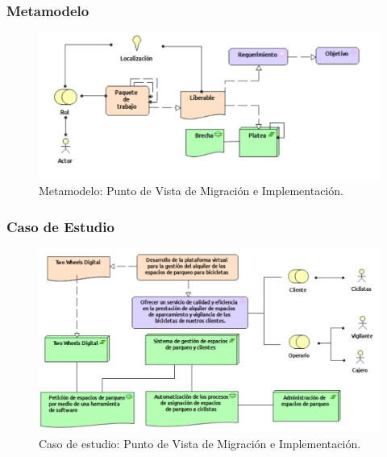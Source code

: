 \subsubsection{Metamodelo}
\begin{figure}[H]
	\centering
	\includegraphics[width=1.0\textwidth]{imagenes/Metamodelos/Migracion/meta_Migracion_implementacion.pdf}
	\caption{Metamodelo: Punto de Vista de Migración e Implementación.}
	\label{fig:gap_analysis}
\end{figure}

\subsubsection{Caso de Estudio}


\begin{figure}[H]
	\centering
	\includegraphics[width=1.0\textwidth]{imagenes/Caso_Estudio/Migracion/Migracion_Implementacion.PDF}
	\caption{Caso de estudio: Punto de Vista de Migración e Implementación.}
	\label{fig:gap_analysis}
\end{figure}

